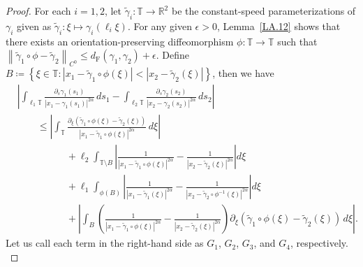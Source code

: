\documentclass[reqno,centertags,12pt]{amsart}
\theoremstyle{definition}
\numberwithin{equation}{section}
\newcommand{\abs}[1]{\left\lvert#1\right\rvert}
\newcommand{\norm}[1]{\left\|#1\right\|}
\newcommand{\setbc}[2]{\left\{ #1\colon#2 \right\}}
\newcommand{\bbR}{{\mathbb{R}}}
\newcommand{\bbT}{{\mathbb{T}}}
\begin{document}
\begin{proof}
    For each $i=1,2$, let $\tilde{\gamma}_{i}\colon\bbT\to\bbR^{2}$ be the constant-speed
    parameterizations of $\gamma_{i}$ given as
    $\tilde{\gamma}_{i}\colon\xi\mapsto \gamma_{i}(\ell_{i}\xi)$.
    For any given $\epsilon>0$, Lemma~\ref{LA.12}
    shows that there exists an orientation-preserving diffeomorphism
    $\phi\colon\bbT\to\bbT$ such that
    $\norm{\tilde{\gamma}_{1}\circ\phi - \tilde{\gamma}_{2}}_{C^{0}}
    \leq d_{\mathrm{F}}(\gamma_{1},\gamma_{2}) + \epsilon$.
    Define $B\coloneqq\setbc{\xi\in\bbT}{\abs{x_{1} - \tilde{\gamma}_{1}\circ\phi(\xi)}
    < \abs{x_{2} - \tilde{\gamma}_{2}(\xi)}}$, then we have
    \begin{align*}
        &\abs{\int_{\ell_{1}\bbT}\frac{\partial_{s}\gamma_{1}(s_{1})}
        {\abs{x_{1} - \gamma_{1}(s_{1})}^{2\alpha}}\,ds_{1}
        - \int_{\ell_{2}\bbT}\frac{\partial_{s}\gamma_{2}(s_{2})}
        {\abs{x_{2} - \gamma_{2}(s_{2})}^{2\alpha}}\,ds_{2}}
        \\&\quad\quad\leq
        \abs{\int_{\bbT}
        \frac{\partial_{\xi}(\tilde{\gamma}_{1}\circ\phi(\xi) - \tilde{\gamma}_{2}(\xi))}
        {\abs{x_{1} - \tilde{\gamma}_{1}\circ\phi(\xi)}^{2\alpha}}\,d\xi}
        \\&\quad\quad\quad\quad\quad
        + \ell_{2}\int_{\bbT\setminus B}
        \abs{\frac{1}{\abs{x_{1} - \tilde{\gamma}_{1}\circ\phi(\xi)}^{2\alpha}}
        - \frac{1}{\abs{x_{2} - \tilde{\gamma}_{2}(\xi)}^{2\alpha}}}d\xi
        \\&\quad\quad\quad\quad\quad
        + \ell_{1}\int_{\phi(B)}
        \abs{\frac{1}{\abs{x_{1} - \tilde{\gamma}_{1}(\xi)}^{2\alpha}}
        - \frac{1}{\abs{x_{2} - \tilde{\gamma}_{2}\circ\phi^{-1}(\xi)}^{2\alpha}}}d\xi
        \\&\quad\quad\quad\quad\quad
        + \abs{\int_{B}\left(
            \frac{1}{\abs{x_{1} - \tilde{\gamma}_{1}\circ\phi(\xi)}^{2\alpha}}
            - \frac{1}{\abs{x_{2} - \tilde{\gamma}_{2}(\xi)}^{2\alpha}}
        \right)
        \partial_{\xi}(\tilde{\gamma}_{1}\circ\phi(\xi) - \tilde{\gamma}_{2}(\xi))\,d\xi}.
    \end{align*}
    Let us call each term in the right-hand side as
    $G_{1}$, $G_{2}$, $G_{3}$, and $G_{4}$, respectively.\\


\end{proof}
\end{document}
